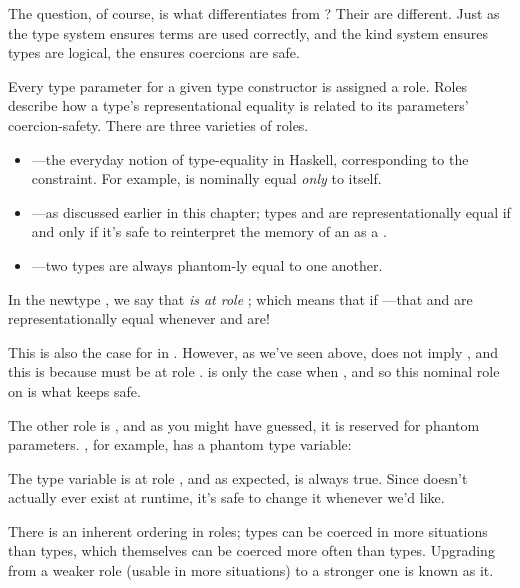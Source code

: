 \documentclass[book.tex]{subfiles}
\begin{document}
The question, of course, is what differentiates  from ? Their
 are different. Just as the type system ensures terms are
used correctly, and the kind system ensures types are logical, the  ensures coercions are safe.

Every type parameter for a given type constructor is assigned a role. Roles
describe how a type's representational equality is related to its parameters'
coercion-safety. There are three varieties of roles.

\begin{itemize}
  \item{---the everyday notion of type-equality in Haskell,
    corresponding to the  constraint. For example,  is
    nominally equal \emph{only} to itself.}
  \item{---as discussed earlier in this chapter; types
     and  are representationally equal if and only if it's safe to
    reinterpret the memory of an  as a .}
  \item{---two types are always phantom-ly equal to one another.}
\end{itemize}

In the newtype , we say that  \emph{is at role}
; which means that if ---that  and  are representationally equal
whenever  and  are!

This is also the case for  in . However, as we've seen above,
 does not imply , and
this is because  must be at role .  is only the case when , and so this nominal role
on  is what keeps  safe.

The other role is , and as you might have guessed, it is reserved
for phantom parameters. , for example, has a phantom type variable:


The type variable  is at role , and as expected,  is always true. Since  doesn't actually ever exist at
runtime, it's safe to change it whenever we'd like.

There is an inherent ordering in roles;  types can be coerced in
more situations than  types, which themselves can be
coerced more often than  types. Upgrading from a weaker role (usable
in more situations) to a stronger one is known as
 it.
\end{document}
